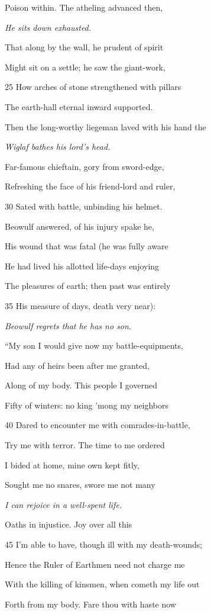 Poison within. The atheling advanced then,

\emph{He sits down exhausted.}

That along by the wall, he prudent of spirit

Might sit on a settle; he saw the giant-work,

25
How arches of stone strengthened with pillars

The earth-hall eternal inward supported.

Then the long-worthy liegeman laved with his hand the

\emph{Wiglaf bathes his
lord’s head.}

Far-famous chieftain, gory from sword-edge,

Refreshing the face of his friend-lord and ruler,

30
Sated with battle, unbinding his helmet.

Beowulf answered, of his injury spake he,

His wound that was fatal (he was fully aware

He had lived his allotted life-days enjoying

The pleasures of earth; then past was entirely

35
His measure of days, death very near):

\emph{Beowulf regrets
that he has no son.}

“My son I would give now my battle-equipments,

Had any of heirs been after me granted,

Along of my body. This people I governed

Fifty of winters: no king ’mong my neighbors

40
Dared to encounter me with comrades-in-battle,

Try me with terror. The time to me ordered

I bided at home, mine own kept fitly,

Sought me no snares, swore me not many

\emph{I can rejoice in a
well-spent life.}

Oaths in injustice. Joy over all this

45
I’m able to have, though ill with my death-wounds;

Hence the Ruler of Earthmen need not charge me

With the killing of kinsmen, when cometh my life out

Forth from my body. Fare thou with haste now

